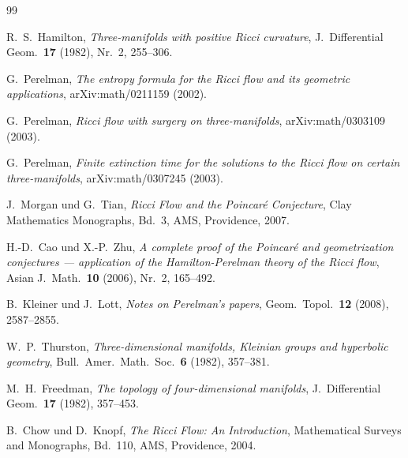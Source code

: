 \documentclass[12pt,a4paper]{amsart}
\theoremstyle{definition}
\theoremstyle{remark}
\begin{document}
\begin{thebibliography}{99}

R.~S.~Hamilton,
\textit{Three-manifolds with positive Ricci curvature},
J.\ Differential Geom.\ \textbf{17} (1982), Nr.~2, 255--306.

G.~Perelman,
\textit{The entropy formula for the Ricci flow and its geometric applications},
arXiv:math/0211159 (2002).

G.~Perelman,
\textit{Ricci flow with surgery on three-manifolds},
arXiv:math/0303109 (2003).

G.~Perelman,
\textit{Finite extinction time for the solutions to the Ricci flow on certain three-manifolds},
arXiv:math/0307245 (2003).

J.~Morgan und G.~Tian,
\textit{Ricci Flow and the Poincar\'{e} Conjecture},
Clay Mathematics Monographs, Bd.~3, AMS, Providence, 2007.

H.-D.~Cao und X.-P.~Zhu,
\textit{A complete proof of the Poincar\'{e} and geometrization conjectures ---
application of the Hamilton-Perelman theory of the Ricci flow},
Asian J.\ Math.\ \textbf{10} (2006), Nr.~2, 165--492.

B.~Kleiner und J.~Lott,
\textit{Notes on Perelman's papers},
Geom.\ Topol.\ \textbf{12} (2008), 2587--2855.

W.~P.~Thurston,
\textit{Three-dimensional manifolds, Kleinian groups and hyperbolic geometry},
Bull.\ Amer.\ Math.\ Soc.\ \textbf{6} (1982), 357--381.

M.~H.~Freedman,
\textit{The topology of four-dimensional manifolds},
J.\ Differential Geom.\ \textbf{17} (1982), 357--453.

B.~Chow und D.~Knopf,
\textit{The Ricci Flow: An Introduction},
Mathematical Surveys and Monographs, Bd.~110, AMS, Providence, 2004.

\end{thebibliography}
\end{document}
